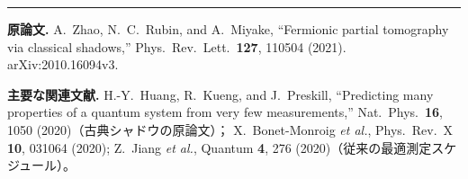 \documentclass[11pt,a4paper]{ltjsarticle}
\theoremstyle{definition}
\theoremstyle{plain}
\begin{document}
\bigskip
\hrule
\bigskip
\noindent\textbf{原論文.}\;
A.~Zhao, N.~C.~Rubin, and A.~Miyake,
``Fermionic partial tomography via classical shadows,''
Phys.\ Rev.\ Lett.\ \textbf{127}, 110504 (2021).
arXiv:2010.16094v3.

\medskip
\noindent\textbf{主要な関連文献.}\;
H.-Y.~Huang, R.~Kueng, and J.~Preskill,
``Predicting many properties of a quantum system from very few measurements,''
Nat.\ Phys.\ \textbf{16}, 1050 (2020)（古典シャドウの原論文）；
X.~Bonet-Monroig \textit{et al.}, Phys.\ Rev.\ X \textbf{10}, 031064 (2020);
Z.~Jiang \textit{et al.}, Quantum \textbf{4}, 276 (2020)（従来の最適測定スケジュール）。
\end{document}
